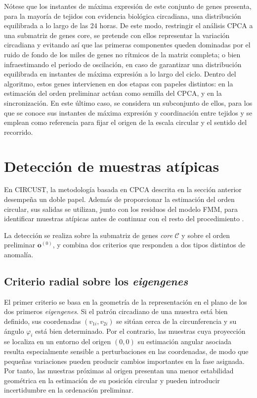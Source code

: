 \documentclass[12pt, a4paper]{report}
\begin{document}
Nótese que los instantes de máxima expresión de este conjunto de genes presenta, para la mayoría de tejidos con evidencia biológica circadiana, una distribución equilibrada a lo largo de las 24 horas. De este modo, restringir el análisis CPCA a una submatriz de genes core, se pretende con ellos representar la variación circadiana y evitando así que las primeras componentes queden dominadas por el ruido de fondo de los miles de genes no rítmicos de la matriz completa; o bien infraestimando el periodo de oscilación, en caso de garantizar una distribución equilibrada en instantes de máxima expresión a lo largo del ciclo. Dentro del algoritmo, estos genes intervienen en dos etapas con papeles distintos: en la estimación del orden preliminar actúan como semilla del CPCA, y en la sincronización. En este último caso, se considera un subconjunto de ellos, para los que se conoce sus instantes de máxima expresión y coordinación entre tejidos y se emplean como referencia para fijar el origen de la escala circular y el sentido del recorrido.

\section{Detección de muestras atípicas}
\label{sec:DeteccionAtipicas}

En CIRCUST, la metodología basada en CPCA descrita en la sección anterior desempeña un doble papel. Además de proporcionar la estimación del orden circular, sus salidas se utilizan, junto con los residuos del modelo FMM, para identificar muestras atípicas antes de continuar con el resto del procedimiento \citep{larriba2023}.

La detección se realiza sobre la submatriz de genes \textit{core} \(\mathcal{C}\) y sobre el orden preliminar \(\mathbf{o}^{(0)}\), y combina dos criterios que responden a dos tipos distintos de anomalía.

\subsection{Criterio radial sobre los \emph{eigengenes}}

El primer criterio se basa en la geometría de la representación en el plano de los dos primeros \emph{eigengenes}. Si el patrón circadiano de una muestra está bien definido, sus coordenadas \((v_{1i},v_{2i})\) se sitúan cerca de la circunferencia y su ángulo \(\varphi_i\) está bien determinado. Por el contrario, las muestras cuya proyección se localiza en un entorno del origen \((0,0)\) su estimación angular asociada resulta especialmente sensible a perturbaciones en las coordenadas, de modo que pequeñas variaciones pueden producir cambios importantes en la fase asignada. Por tanto, las muestras próximas al origen presentan una menor estabilidad geométrica en la estimación de su posición circular y pueden introducir incertidumbre en la ordenación preliminar.
\end{document}
